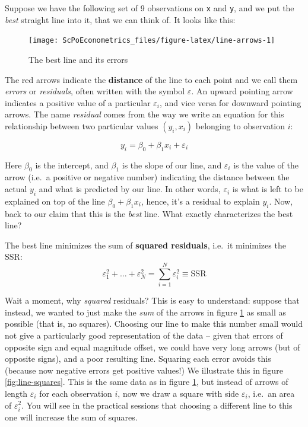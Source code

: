 \documentclass[]{book}
\newenvironment{warning}{\begin{tcolorbox}[colback=orange!5!white,colframe=orange,title=\textbf{Warning!}]}{\end{tcolorbox}}
\theoremstyle{definition}
\theoremstyle{definition}
\theoremstyle{definition}
\theoremstyle{remark}
\begin{document}
Suppose we have the following set of 9 observations on \texttt{x} and
\texttt{y}, and we put the \emph{best} straight line into it, that we
can think of. It looks like this:

\begin{figure}

{\centering \texttt{[image: ScPoEconometrics\_files/figure-latex/line-arrows-1]} 

}

\caption{The best line and its errors}\label{fig:line-arrows}
\end{figure}

The red arrows indicate the \textbf{distance} of the line to each point
and we call them \emph{errors} or \emph{residuals}, often written with
the symbol \(\varepsilon\). An upward pointing arrow indicates a
positive value of a particular \(\varepsilon_i\), and vice versa for
downward pointing arrows. The name \emph{residual} comes from the way we
write an equation for this relationship between two particular values
\((y_i,x_i)\) belonging to observation \(i\):

\[
y_i = \beta_0 + \beta_1 x_i + \varepsilon_i \label{eq:abline}
\]

Here \(\beta_0\) is the intercept, and \(\beta_1\) is the slope of our
line, and \(\varepsilon_i\) is the value of the arrow (i.e.~a positive
or negative number) indicating the distance between the actual \(y_i\)
and what is predicted by our line. In other words, \(\varepsilon_i\) is
what is left to be explained on top of the line
\(\beta_0 + \beta_1 x_i\), hence, it's a residual to explain \(y_i\).
Now, back to our claim that this is the \emph{best} line. What exactly
characterizes the best line?

\begin{warning}
The best line minimizes the sum of \textbf{squared residuals}, i.e.~it
minimizes the SSR:
\[ \varepsilon_1^2 + \dots + \varepsilon_N^2 = \sum_{i=1}^N \varepsilon_i^2 \equiv \text{SSR}\]
\end{warning}

 Wait a moment, why \emph{squared} residuals? This is easy to
understand: suppose that instead, we wanted to just make the \emph{sum}
of the arrows in figure \ref{fig:line-arrows} as small as possible (that
is, no squares). Choosing our line to make this number small would not
give a particularly good representation of the data -- given that errors
of opposite sign and equal magnitude offset, we could have very long
arrows (but of opposite signs), and a poor resulting line. Squaring each
error avoids this (because now negative errors get positive values!) We
illustrate this in figure \ref{fig:line-squares}. This is the same data
as in figure \ref{fig:line-arrows}, but instead of arrows of length
\(\varepsilon_i\) for each observation \(i\), now we draw a square with
side \(\varepsilon_i\), i.e.~an area of \(\varepsilon_i^2\). You will
see in the practical sessions that choosing a different line to this one
will increase the sum of squares.
\end{document}
